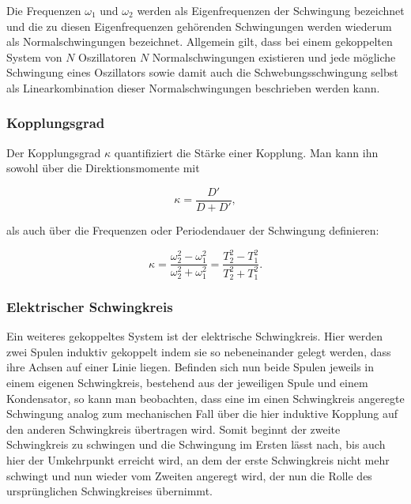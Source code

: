 \documentclass{article}
\begin{document}
Die Frequenzen $\omega_1$ und $\omega_2$ werden als Eigenfrequenzen der Schwingung bezeichnet und die zu diesen Eigenfrequenzen gehörenden Schwingungen werden wiederum als Normalschwingungen bezeichnet. Allgemein gilt, dass bei einem gekoppelten System von $N$ Oszillatoren $N$ Normalschwingungen existieren und jede mögliche Schwingung eines Oszillators sowie damit auch die Schwebungsschwingung selbst als Linearkombination dieser Normalschwingungen beschrieben werden kann. 

\subsubsection{Kopplungsgrad}

Der Kopplungsgrad $\kappa$ quantifiziert die Stärke einer Kopplung. Man kann ihn sowohl über die Direktionsmomente mit 

\begin{equation}
    \kappa = \frac{D'}{D + D'},
    \label{eq:KopplGr_D}
\end{equation}

als auch über die Frequenzen oder Periodendauer der Schwingung definieren:

\begin{equation}
    \kappa = \frac{\omega_2^2 - \omega_1^2}{\omega_2^2 + \omega_1^2} = \frac{T_2^2 - T_1^2}{T_2^2 + T_1^2}.
    \label{eq:KopplGr_wT}
\end{equation}

\subsubsection{Elektrischer Schwingkreis}

Ein weiteres gekoppeltes System ist der elektrische Schwingkreis. Hier werden zwei Spulen induktiv gekoppelt indem sie so nebeneinander gelegt werden, dass ihre Achsen auf einer Linie liegen. Befinden sich nun beide Spulen jeweils in einem eigenen Schwingkreis, bestehend aus der jeweiligen Spule und einem Kondensator, so kann man beobachten, dass eine im einen Schwingkreis angeregte Schwingung analog zum mechanischen Fall über die hier induktive Kopplung auf den anderen Schwingkreis übertragen wird. Somit beginnt der zweite Schwingkreis zu schwingen und die Schwingung im Ersten lässt nach, bis auch hier der Umkehrpunkt erreicht wird, an dem der erste Schwingkreis nicht mehr schwingt und nun wieder vom Zweiten angeregt wird, der nun die Rolle des ursprünglichen Schwingkreises übernimmt.     
\end{document}
